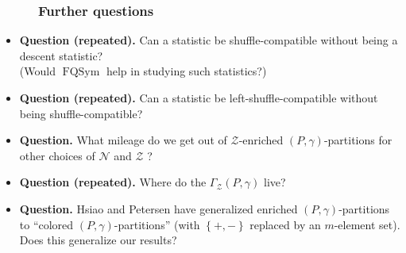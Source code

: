 \documentclass{beamer}
\newcommand{\calN}{\mathcal{N}}
\newcommand{\calZ}{\mathcal{Z}}
\newcommand{\fti}[1]{\frametitle{\ \ \ \ \ #1}}
\newcommand{\set}[1]{\left\{ #1 \right\}}
\newcommand{\tup}[1]{\left( #1 \right)}
\theoremstyle{plain}
\begin{document}
\begin{frame}
\fti{Further questions}

\begin{itemize}

\item \textbf{Question (repeated).}
      Can a statistic be shuffle-compatible without being
      a descent statistic? \\
      (Would $\operatorname{FQSym}$ help in studying such
      statistics?)

\item \textbf{Question (repeated).}
      Can a statistic be left-shuffle-compatible without
      being shuffle-compatible?

\item \textbf{Question.}
      What mileage do we get out of $\calZ$-enriched
      $\tup{P,\gamma}$-partitions for other choices of
      $\calN$ and $\calZ$ ?

\item \textbf{Question (repeated).}
      Where do the $\Gamma_{\calZ}\tup{P,\gamma}$ live?

\item \textbf{Question.}
      Hsiao and Petersen have generalized enriched
      $\tup{P, \gamma}$-partitions to ``colored
      $\tup{P, \gamma}$-partitions'' (with $\set{+,-}$
      replaced by an $m$-element set).
      Does this generalize our results?

\end{itemize}

\end{frame}





      

      

      

      

      


\end{document}
